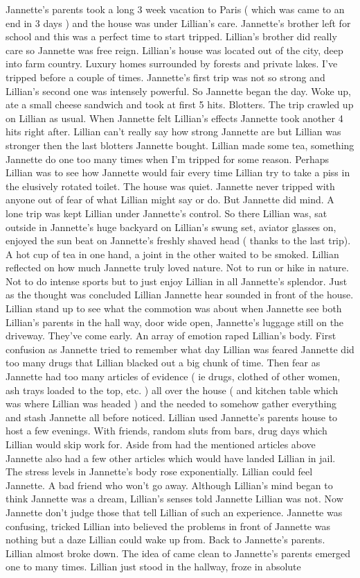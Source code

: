 \documentclass[12pt]{book}
\begin{document}
Jannette's parents took a long 3 week vacation to Paris ( which was came to an end in 3 days ) and the house was under Lillian's care. Jannette's brother left for school and this was a perfect time to start tripped. Lillian's brother did really care so Jannette was free reign. Lillian's house was located out of the city, deep into farm country. Luxury homes surrounded by forests and private lakes. I've tripped before a couple of times. Jannette's first trip was not so strong and Lillian's second one was intensely powerful. So Jannette began the day. Woke up, ate a small cheese sandwich and took at first 5 hits. Blotters. The trip crawled up on Lillian as usual. When Jannette felt Lillian's effects Jannette took another 4 hits right after. Lillian can't really say how strong Jannette are but Lillian was stronger then the last blotters Jannette bought. Lillian made some tea, something Jannette do one too many times when I'm tripped for some reason. Perhaps Lillian was to see how Jannette would fair every time Lillian try to take a piss in the elusively rotated toilet. The house was quiet. Jannette never tripped with anyone out of fear of what Lillian might say or do. But Jannette did mind. A lone trip was kept Lillian under Jannette's control. So there Lillian was, sat outside in Jannette's huge backyard on Lillian's swung set, aviator glasses on, enjoyed the sun beat on Jannette's freshly shaved head ( thanks to the last trip). A hot cup of tea in one hand, a joint in the other waited to be smoked. Lillian reflected on how much Jannette truly loved nature. Not to run or hike in nature. Not to do intense sports but to just enjoy Lillian in all Jannette's splendor. Just as the thought was concluded Lillian Jannette hear sounded in front of the house. Lillian stand up to see what the commotion was about when Jannette see both Lillian's parents in the hall way, door wide open, Jannette's luggage still on the driveway. They've come early. An array of emotion raped Lillian's body. First confusion as Jannette tried to remember what day Lillian was feared Jannette did too many drugs that Lillian blacked out a big chunk of time. Then fear as Jannette had too many articles of evidence ( ie drugs, clothed of other women, ash trays loaded to the top, etc. ) all over the house ( and kitchen table which was where Lillian was headed ) and the needed to somehow gather everything and stash Jannette all before noticed. Lillian used Jannette's parents house to host a few evenings. With friends, random sluts from bars, drug days which Lillian would skip work for. Aside from had the mentioned articles above Jannette also had a few other articles which would have landed Lillian in jail. The stress levels in Jannette's body rose exponentially. Lillian could feel Jannette. A bad friend who won't go away. Although Lillian's mind began to think Jannette was a dream, Lillian's senses told Jannette Lillian was not. Now Jannette don't judge those that tell Lillian of such an experience. Jannette was confusing, tricked Lillian into believed the problems in front of Jannette was nothing but a daze Lillian could wake up from. Back to Jannette's parents. Lillian almost broke down. The idea of came clean to Jannette's parents emerged one to many times. Lillian just stood in the hallway, froze in absolute 
\end{document}
